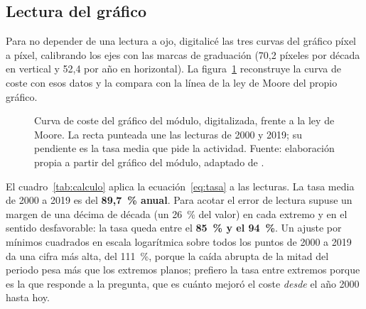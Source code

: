 \documentclass[11pt,letterpaper]{article}
\begin{document}
\subsection*{Lectura del gráfico}

Para no depender de una lectura a ojo, digitalicé las tres curvas del gráfico
píxel a píxel, calibrando los ejes con las marcas de graduación (70,2 píxeles
por década en vertical y 52,4 por año en horizontal). La
figura~\ref{fig:grafico} reconstruye la curva de coste con esos datos y la
compara con la línea de la ley de Moore del propio gráfico.

\begin{figure}[htbp]
\centering
{}
\caption{Curva de coste del gráfico del módulo, digitalizada, frente a la ley
de Moore. La recta punteada une las lecturas de 2000 y 2019; su pendiente es la
tasa media que pide la actividad. Fuente: elaboración propia a partir del
gráfico del módulo, adaptado de \textcite{shendure2017}.}
\label{fig:grafico}
\end{figure}

El cuadro~\ref{tab:calculo} aplica la ecuación~\eqref{eq:tasa} a las lecturas.
La tasa media de 2000 a 2019 es del \textbf{89,7~\% anual}. Para acotar el
error de lectura supuse un margen de una décima de década (un 26~\% del valor)
en cada extremo y en el sentido desfavorable: la tasa queda entre el
\textbf{85~\% y el 94~\%}. Un ajuste por mínimos cuadrados en escala
logarítmica sobre todos los puntos de 2000 a 2019 da una cifra más alta, del
111~\%, porque la caída abrupta de la mitad del periodo pesa más que los
extremos planos; prefiero la tasa entre extremos porque es la que responde a
la pregunta, que es cuánto mejoró el coste \emph{desde} el año 2000 hasta hoy.
\end{document}
